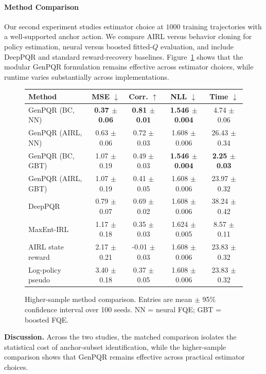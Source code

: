 \documentclass{article}
\newcommand{\1}{\mathbbm{1}}
\begin{document}
\paragraph{Method Comparison}
Our second experiment studies estimator choice at \(1000\) training trajectories with a well-supported anchor action. We compare AIRL versus behavior cloning for policy estimation, neural versus boosted fitted-\(Q\) evaluation, and include DeepPQR and standard reward-recovery baselines. Figure~\ref{fig:exp2_combo} shows that the modular GenPQR formulation remains effective across estimator choices, while runtime varies substantially across implementations.


\begin{figure}[htb]
\centering
\scriptsize
\setlength{\tabcolsep}{3pt}
\begin{tabular}{lcccc}
\toprule
Method & MSE $\downarrow$ & Corr. $\uparrow$ & NLL $\downarrow$ & Time $\downarrow$ \\
\midrule
GenPQR (BC, NN) & \textbf{0.37 $\pm$ 0.06} & \textbf{0.81 $\pm$ 0.01} & \textbf{1.546 $\pm$ 0.004} & 4.74 $\pm$ 0.06 \\
GenPQR (AIRL, NN) & 0.63 $\pm$ 0.06 & 0.72 $\pm$ 0.03 & 1.608 $\pm$ 0.006 & 26.43 $\pm$ 0.34 \\
GenPQR (BC, GBT) & 1.07 $\pm$ 0.19 & 0.49 $\pm$ 0.03 & \textbf{1.546 $\pm$ 0.004} & \textbf{2.25 $\pm$ 0.03} \\
GenPQR (AIRL, GBT) & 1.07 $\pm$ 0.19 & 0.41 $\pm$ 0.05 & 1.608 $\pm$ 0.006 & 23.97 $\pm$ 0.32 \\
\midrule
DeepPQR & 0.79 $\pm$ 0.07 & 0.69 $\pm$ 0.02 & 1.608 $\pm$ 0.006 & 38.24 $\pm$ 0.42 \\
MaxEnt-IRL & 1.17 $\pm$ 0.18 & 0.35 $\pm$ 0.03 & 1.624 $\pm$ 0.005 & 8.57 $\pm$ 0.11 \\
AIRL state reward & 2.17 $\pm$ 0.21 & -0.01 $\pm$ 0.03 & 1.608 $\pm$ 0.006 & 23.83 $\pm$ 0.32 \\
Log-policy pseudo & 3.40 $\pm$ 0.18 & 0.37 $\pm$ 0.05 & 1.608 $\pm$ 0.006 & 23.83 $\pm$ 0.32 \\
\bottomrule
\end{tabular}
\caption{Higher-sample method comparison. Entries are mean $\pm$ 95\% confidence interval over 100 seeds. NN = neural FQE; GBT = boosted FQE.}
\label{fig:exp2_combo}
\end{figure}


\textbf{Discussion.} Across the two studies, the matched comparison isolates the statistical cost of anchor-subset identification, while the higher-sample comparison shows that GenPQR remains effective across practical estimator choices.
\end{document}
